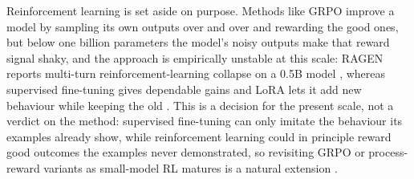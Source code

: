 Reinforcement learning is set aside on purpose. Methods like GRPO improve a model by sampling its own outputs over and over and rewarding the good ones, but below one billion parameters the model's noisy outputs make that reward signal shaky, and the approach is empirically unstable at this scale: RAGEN reports multi-turn reinforcement-learning collapse on a 0.5B model \cite{wang2025ragenunderstandingselfevolutionllm}, whereas supervised fine-tuning gives dependable gains and LoRA lets it add new behaviour while keeping the old \cite{hu2021loralowrankadaptationlarge}. This is a decision for the present scale, not a verdict on the method: supervised fine-tuning can only imitate the behaviour its examples already show, while reinforcement learning could in principle reward good outcomes the examples never demonstrated, so revisiting GRPO or process-reward variants as small-model RL matures is a natural extension \cite{shao2024deepseekmathpushinglimitsmathematical, yu2025dapoopensourcellmreinforcement}.

